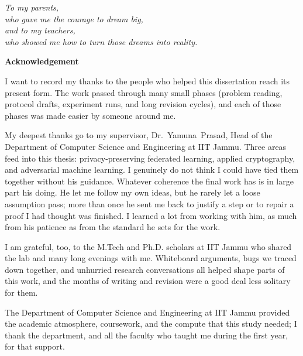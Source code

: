 \newpage
\thispagestyle{empty}
\cleardoublepage

\newpage
\thispagestyle{empty}
\vspace*{\fill}
\begin{center}
	\textit{\Large To my parents,}\\[0.4em]
	\textit{\Large who gave me the courage to dream big,}\\[0.4em]
	\textit{\Large and to my teachers,}\\[0.4em]
	\textit{\Large who showed me how to turn those dreams into reality.}
\end{center}
\vspace*{\fill}

\newpage
\thispagestyle{empty}
\cleardoublepage

\newpage
\thispagestyle{plain}
\begin{center}
\textbf{\Large Acknowledgement}
\end{center}

I want to record my thanks to the people who helped this dissertation reach its present form. The work passed through many small phases (problem reading, protocol drafts, experiment runs, and long revision cycles), and each of those phases was made easier by someone around me.

My deepest thanks go to my supervisor, Dr.~Yamuna~Prasad, Head of the Department of Computer Science and Engineering at IIT Jammu. Three areas feed into this thesis: privacy-preserving federated learning, applied cryptography, and adversarial machine learning. I genuinely do not think I could have tied them together without his guidance. Whatever coherence the final work has is in large part his doing. He let me follow my own ideas, but he rarely let a loose assumption pass; more than once he sent me back to justify a step or to repair a proof I had thought was finished. I learned a lot from working with him, as much from his patience as from the standard he sets for the work.

I am grateful, too, to the M.Tech and Ph.D. scholars at IIT Jammu who shared the lab and many long evenings with me. Whiteboard arguments, bugs we traced down together, and unhurried research conversations all helped shape parts of this work, and the months of writing and revision were a good deal less solitary for them.

The Department of Computer Science and Engineering at IIT Jammu provided the academic atmosphere, coursework, and the compute that this study needed; I thank the department, and all the faculty who taught me during the first year, for that support.

